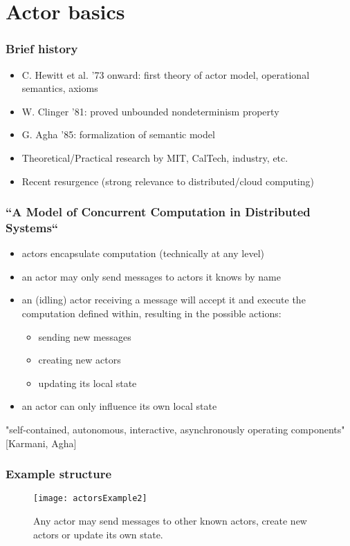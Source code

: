 \section{Actor basics}
\begin{frame}
\frametitle{Brief history}
\begin{itemize}
\item C. Hewitt et al. '73 onward: first theory of actor model, operational semantics, axioms
\item W. Clinger '81: proved unbounded nondeterminism property
\item G. Agha '85: formalization of semantic model
\item Theoretical/Practical research by MIT, CalTech, industry, etc.
\item Recent resurgence (strong relevance to distributed/cloud computing)
\end{itemize}
\end{frame}

\begin{frame}
\frametitle{``A Model of Concurrent Computation in Distributed Systems``}
\begin{itemize}
\item actors encapsulate computation (technically at any level)
\item an actor may only send messages to actors it knows by name
\item an (idling) actor receiving a message will accept it and execute the computation defined within, resulting in the possible actions:
	\begin{itemize}
	\item sending new messages
	\item creating new actors
	\item updating its local state
	\end{itemize}
\item an actor can only influence its own local state
\end{itemize}
\textrightarrow "self-contained, autonomous, interactive, asynchronously operating components" [Karmani, Agha]
\end{frame}

\begin{frame}
\frametitle{Example structure}
\begin{figure}
\centerline{
\texttt{[image: actorsExample2]}
}
\caption{Any actor may send messages to other known actors, create new actors or update its own state.}
\label{Actors}
\end{figure}
\end{frame}

